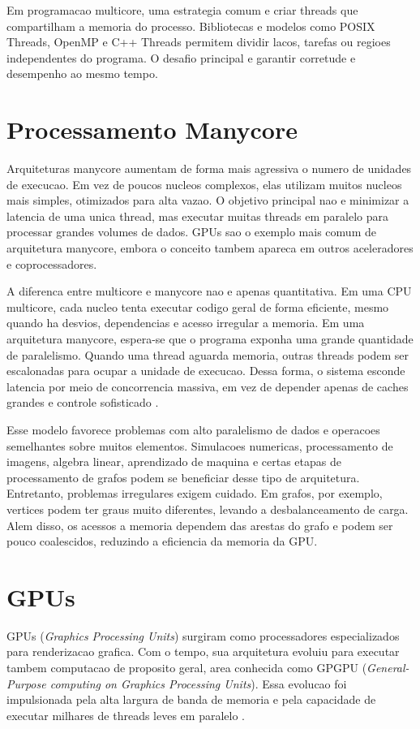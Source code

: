 Em programacao multicore, uma estrategia comum e criar threads que compartilham a
memoria do processo. Bibliotecas e modelos como POSIX Threads, OpenMP e C++
Threads permitem dividir lacos, tarefas ou regioes independentes do programa. O
desafio principal e garantir corretude e desempenho ao mesmo tempo. 

\section{Processamento Manycore}

Arquiteturas manycore aumentam de forma mais agressiva o numero de unidades de
execucao. Em vez de poucos nucleos complexos, elas utilizam muitos nucleos mais
simples, otimizados para alta vazao. O objetivo principal nao e minimizar a
latencia de uma unica thread, mas executar muitas threads em paralelo para
processar grandes volumes de dados. GPUs sao o exemplo mais comum de arquitetura
manycore, embora o conceito tambem apareca em outros aceleradores e coprocessadores.

A diferenca entre multicore e manycore nao e apenas quantitativa. Em uma CPU
multicore, cada nucleo tenta executar codigo geral de forma eficiente, mesmo
quando ha desvios, dependencias e acesso irregular a memoria. Em uma arquitetura
manycore, espera-se que o programa exponha uma grande quantidade de paralelismo.
Quando uma thread aguarda memoria, outras threads podem ser escalonadas para
ocupar a unidade de execucao. Dessa forma, o sistema esconde latencia por meio de
concorrencia massiva, em vez de depender apenas de caches grandes e controle
sofisticado \cite{kirkgpu}.

Esse modelo favorece problemas com alto paralelismo de dados e operacoes
semelhantes sobre muitos elementos. Simulacoes numericas, processamento de
imagens, algebra linear, aprendizado de maquina e certas etapas de processamento
de grafos podem se beneficiar desse tipo de arquitetura. Entretanto, problemas
irregulares exigem cuidado. Em grafos, por exemplo, vertices podem ter graus
muito diferentes, levando a desbalanceamento de carga. Alem disso, os acessos a
memoria dependem das arestas do grafo e podem ser pouco coalescidos, reduzindo a
eficiencia da memoria da GPU.

\section{GPUs}
GPUs (\textit{Graphics Processing Units}) surgiram como processadores
especializados para renderizacao grafica. Com o tempo, sua arquitetura evoluiu
para executar tambem computacao de proposito geral, area conhecida como GPGPU
(\textit{General-Purpose computing on Graphics Processing Units}). Essa evolucao
foi impulsionada pela alta largura de banda de memoria e pela capacidade de
executar milhares de threads leves em paralelo \cite{owensgpu, kirkgpu}.

